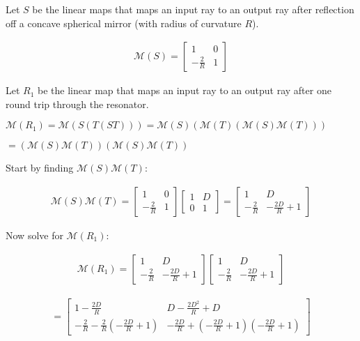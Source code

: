 \documentclass[fleqn]{article}
\begin{document}
\begin{enumerate}[nolistsep]
			Let $S$ be the linear maps that maps an input ray to an output ray after reflection off a concave spherical mirror (with radius of curvature $R$).
			
			\begin{align*}
				\mathcal{M}(S) = \begin{bmatrix} 1 & 0\\ -\frac{2}{R} & 1 \end{bmatrix}
			\end{align*}
			
			Let $R_1$ be the linear map that maps an input ray to an output ray after one round trip through the resonator.
			
			$\mathcal{M}(R_1) = \mathcal{M}(S(T(ST))) = \mathcal{M}(S)(\mathcal{M}(T)(\mathcal{M}(S)\mathcal{M}(T)))$
			
			$ = (\mathcal{M}(S)\mathcal{M}(T))(\mathcal{M}(S)\mathcal{M}(T))$
			
			Start by finding $\mathcal{M}(S)\mathcal{M}(T)$:
			
			\begin{align*}
				\mathcal{M}(S)\mathcal{M}(T) = \begin{bmatrix} 1 & 0\\ -\frac{2}{R} & 1 \end{bmatrix} \begin{bmatrix}1 & D\\ 0 & 1\end{bmatrix} = \begin{bmatrix}1 & D\\ -\frac{2}{R} & -\frac{2D}{R} + 1\end{bmatrix}
			\end{align*}
			
			Now solve for $\mathcal{M}(R_1)$:
			
			\begin{align*}
				\mathcal{M}(R_1) = \begin{bmatrix}1 & D\\ -\frac{2}{R} & -\frac{2D}{R} + 1\end{bmatrix}\begin{bmatrix}1 & D\\ -\frac{2}{R} & -\frac{2D}{R} + 1\end{bmatrix}
			\end{align*}
			
			\begin{align*}
				= \begin{bmatrix}1 - \frac{2D}{R} & D - \frac{2D^2}{R} + D\\ -\frac{2}{R} - \frac{2}{R}(-\frac{2D}{R} + 1) & -\frac{2D}{R} + (-\frac{2D}{R}+1)(-\frac{2D}{R}+1)\end{bmatrix}
			\end{align*}
			

\end{enumerate}
\end{document}
